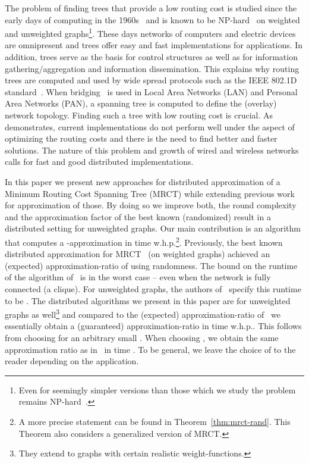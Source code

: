 \documentclass[11pt]{article}
\begin{document}
The problem of finding trees that provide a low routing cost is studied since the early days of computing in the 1960s~\cite{scott1969optimal}
and is known to be NP-hard~\cite{johnson1978complexity} on weighted and unweighted graphs\footnote{Even for seemingly simpler versions than those which we study the problem remains NP-hard~\cite{ye2002polynomial}.}. These days networks of computers and electric devices are omnipresent and trees offer easy and fast implementations for applications. In addition, trees serve as the basis for control structures as well as for information gathering/aggregation and information dissemination. This explains why routing trees are computed and used by wide spread protocols such as the IEEE 802.1D standard~\cite{campos2008fast}. When bridging~\cite{wiki2} is used in Local Area Networks (LAN) and Personal Area Networks (PAN), a spanning tree is computed to define the (overlay)
network topology. Finding such a tree with low routing cost is crucial. As~\cite{campos2008fast} demonstrates, current implementations do not perform well under the aspect of optimizing the routing costs and there is the need to find better and faster solutions. The nature of this problem and growth of wired and wireless networks calls for fast and good distributed implementations. 


In this paper we present new approaches for distributed approximation of a Minimum Routing Cost Spanning Tree (MRCT) while extending previous work for approximation of those. By doing so we improve both, the round complexity and the approximation factor of the best known (randomized) result in a distributed setting for unweighted graphs. Our main contribution is an algorithm that computes a -approximation in time  w.h.p.\footnote{A more precise statement can be found in Theorem~\ref{thm:mrct-rand}. This Theorem also considers a generalized version of MRCT.}. Previously, the best known distributed approximation for MRCT~\cite{khan2008efficient} (on weighted graphs) achieved an (expected) approximation-ratio of  using randomness. The bound on the runtime of the algorithm of~\cite{khan2008efficient} is  in the worst case -- even when the network is fully connected (a clique). For unweighted graphs, the authors of~\cite{khan2008efficient} specify this runtime to be . The distributed algorithms we present in this paper are for unweighted graphs as well\footnote{They extend to graphs with certain realistic weight-functions.} and compared to the (expected) approximation-ratio  of~\cite{khan2008efficient} we essentially obtain a (guaranteed) approximation-ratio  in time  w.h.p.. This follows from choosing  for an arbitrary small . When choosing , we obtain the same approximation ratio as in~\cite{khan2008efficient} in time . To be general, we leave the choice of  to the reader depending on the application.
\end{document}
